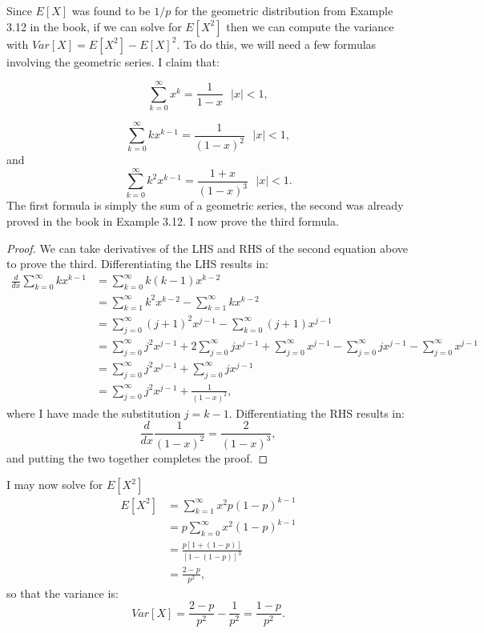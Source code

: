 \begin{problem}{17}  Since $E[X]$ was found to be $1/p$ for the geometric distribution from Example 3.12 in the book, if we can solve for $E[X^2]$ then we can compute the variance with $Var[X] = E[X^2]-E[X]^2$.  To do this, we will need a few formulas involving the geometric series.  I claim that:

\begin{equation*}
\sum_{k=0}^\infty x^k = \frac{1}{1-x} ~~~|x|<1,
\end{equation*}

\begin{equation*}
\sum_{k=0}^\infty k x^{k-1} = \frac{1}{(1-x)^2} ~~~|x|<1,
\end{equation*}
and
\begin{equation*}
\sum_{k=0}^\infty k^2 x^{k-1} =\frac{1+x}{(1-x)^3} ~~~|x|<1.
\end{equation*}
The first formula is simply the sum of a geometric series, the second was already proved in the book in Example 3.12.  I now prove the third formula.

\begin{proof}
We can take derivatives of the LHS and RHS of the second equation above to prove the third.  Differentiating the LHS results in:
\begin{align*}
\frac{d}{dx} \sum_{k=0}^\infty k x^{k-1} &= \sum_{k=0}^\infty k(k-1) x^{k-2} \\
& =  \sum_{k=1}^\infty k^2 x^{k-2}- \sum_{k=1}^\infty k x^{k-2} \\
& =\sum_{j=0}^\infty (j+1)^2 x^{j-1}- \sum_{k=0}^\infty (j+1) x^{j-1} \\
& =\sum_{j=0}^\infty j^2 x^{j-1}+2\sum_{j=0}^\infty j x^{j-1} +\sum_{j=0}^\infty x^{j-1}-\sum_{j=0}^\infty j x^{j-1}-\sum_{j=0}^\infty x^{j-1}\\
& = \sum_{j=0}^\infty j^2 x^{j-1}+\sum_{j=0}^\infty j x^{j-1} \\
&=\sum_{j=0}^\infty j^2 x^{j-1}+\frac{1}{(1-x)^2},
\end{align*}
where I have made the substitution $j=k-1$.  Differentiating the RHS results in:
\begin{equation*}
\frac{d}{dx} \frac{1}{(1-x)^2} = \frac{2}{(1-x)^3},
\end{equation*}
and putting the two together completes the proof.
\end{proof}
I may now solve for $E[X^2]$
\begin{align*}
E[X^2]&=\sum_{k=1}^\infty x^2p(1-p)^{k-1} \\
& = p\sum_{k=0}^\infty x^2(1-p)^{k-1} \\
& =\frac{p[1+(1-p)]}{[1-(1-p)]^3} \\
& = \frac{2-p}{p^2},
\end{align*}
so that the variance is:
\begin{equation*}
Var[X] = \frac{2-p}{p^2} -\frac{1}{p^2} = \frac{1-p}{p^2}.
\end{equation*}



\end{problem}


